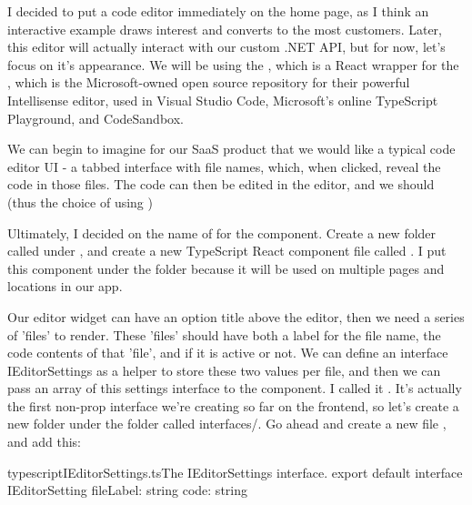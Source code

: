 \documentclass[paper=6in:9in,pagesize=pdftex,headinclude=on,footinclude=on,12pt,twoside]{scrbook}
\makeatletter
\newcommand{\at}{\makeatletter @\makeatother}
\makeatother
\begin{document}
I decided to put a code editor immediately on the home page, as I think an interactive example draws interest and converts to the most customers. Later, this editor will actually interact with our custom .NET API, but for now, let's focus on it's appearance. We will be using the \index{\codeword{\at monaco-editor/react}}, which is a React wrapper for the , which is the Microsoft-owned open source repository for their powerful Intellisense editor, used in Visual Studio Code, Microsoft's online TypeScript Playground, and CodeSandbox. 


We can begin to imagine for our SaaS product that we would like a typical code editor UI - a tabbed interface with file names, which, when clicked, reveal the code in those files. The code can then be edited in the editor, and we should (thus the choice of using )


Ultimately, I decided on the name of  for the component. Create a new folder called  under , and create a new TypeScript React component file called . I put this component under the  folder because it will be used on multiple pages and locations in our app.


Our editor widget can have an option title above the editor, then we need a series of 'files' to render. These 'files' should have both a label for the file name, the code contents of that 'file', and if it is active or not. We can define an interface IEditorSettings as a helper to store these two values per file, and then we can pass an array of this settings interface to the  component. I called it . It's actually the first non-prop interface we're creating so far on the frontend, so let's create a new folder under the  folder called {interfaces/}. Go ahead and create a new file , and add this:

\begin{codeInput}{typescript}{IEditorSettings.ts}{The IEditorSettings interface.}
export default interface IEditorSetting {
  fileLabel: string
  code: string
}  
\end{codeInput}
\end{document}
